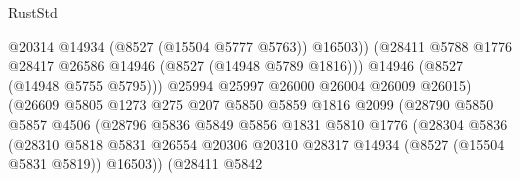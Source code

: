 \begin{lexlean}{RustStd}
\begin{coremodule}
                                            @20314
                                            @14934
                                            (@8527 (@15504 @5777 @5763))
                                            @16503))
                                        (@28411
                                          @5788
                                          @1776
                                          @28417
                                          @26586
                                          @14946
                                          (@8527 (@14948 @5789 @1816)))
                                        @14946
                                        (@8527 (@14948 @5755 @5795)))
                                      @25994
                                      @25997
                                      @26000
                                      @26004
                                      @26009
                                      @26015)
                                    (@26609
                                      @5805
                                      @1273
                                      @275
                                      @207
                                      @5850
                                      @5859
                                      @1816
                                      @2099
                                      (@28790
                                        @5850
                                        @5857
                                        @4506
                                        (@28796
                                          @5836
                                          @5849
                                          @5856
                                          @1831
                                          @5810
                                          @1776
                                          (@28304
                                            @5836
                                            (@28310
                                              @5818
                                              @5831
                                              @26554
                                              @20306
                                              @20310
                                              @28317
                                              @14934
                                              (@8527 (@15504 @5831 @5819))
                                              @16503))
                                          (@28411
                                            @5842

\end{coremodule}
\end{lexlean}
